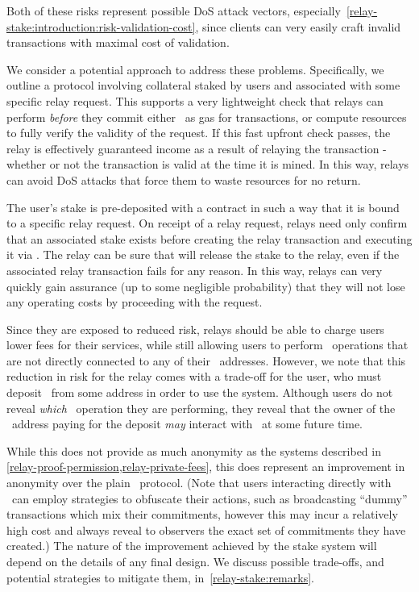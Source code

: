 Both of these risks represent possible DoS attack vectors, especially~\ref{relay-stake:introduction:risk-validation-cost}, since clients can very easily craft invalid transactions with maximal cost of validation.

We consider a potential approach to address these problems. Specifically, we outline a protocol involving collateral staked by users and associated with some specific relay request. This supports a very lightweight check that relays can perform \emph{before} they commit either \ether~as gas for transactions, or compute resources to fully verify the validity of the request. If this fast upfront check passes, the relay is effectively guaranteed income as a result of relaying the transaction - whether or not the transaction is valid at the time it is mined. In this way, relays can avoid DoS attacks that force them to waste resources for no return.

The user's stake is pre-deposited with a contract \stakecontract{} in such a way that it is bound to a specific relay request. On receipt of a relay request, relays need only confirm that an associated stake exists before creating the relay transaction and executing it via \stakecontract{}. The relay can be sure that \stakecontract{} will release the stake to the relay, even if the associated relay transaction fails for any reason. In this way, relays can very quickly gain assurance (up to some negligible probability) that they will not lose any operating costs by proceeding with the request.

Since they are exposed to reduced risk, relays should be able to charge users lower fees for their services, while still allowing users to perform \zeth~operations that are not directly connected to any of their \ethereum~addresses. However, we note that this reduction in risk for the relay comes with a trade-off for the user, who must deposit \ether~from some address in order to use the system. Although users do not reveal \emph{which} \zeth~operation they are performing, they reveal that the owner of the \ethereum~address paying for the deposit \emph{may} interact with \zeth~at some future time.

While this does not provide as much anonymity as the systems described in \cref{relay-proof-permission,relay-private-fees}, this does represent an improvement in anonymity over the plain \zeth~protocol. (Note that users interacting directly with \zeth~can employ strategies to obfuscate their actions, such as broadcasting ``dummy'' transactions which mix their commitments, however this may incur a relatively high cost and always reveal to observers the exact set of commitments they have created.) The nature of the improvement achieved by the stake system will depend on the details of any final design. We discuss possible trade-offs, and potential strategies to mitigate them, in~\cref{relay-stake:remarks}.

